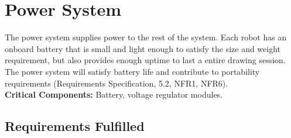 
\section{Power System}
\label{sec:power_system}
The power system supplies power to the rest of the system. Each robot has an onboard battery that is small and light enough to satisfy the size and weight requirement, but also provides enough uptime to last a entire drawing session. The power system will satisfy battery life and contribute to portability requirements (Requirements Specification, 5.2, NFR1, NFR6). \\
\textbf{Critical Components:} Battery, voltage regulator modules. \\

\subsection{Requirements Fulfilled}